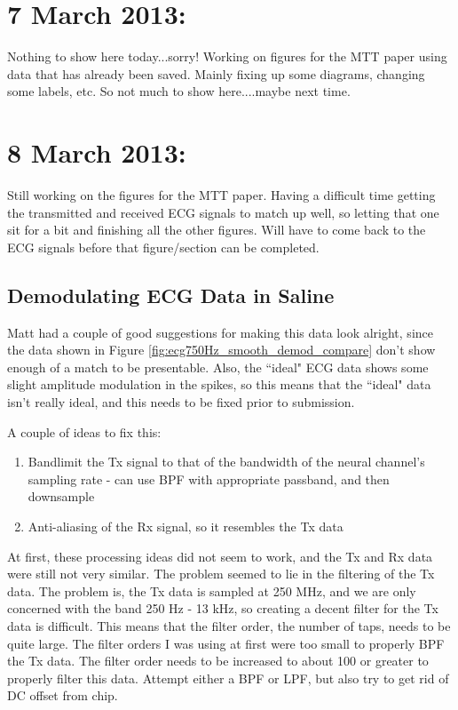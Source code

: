 \documentclass[12pt,onecolumn,titlepage]{article}
\begin{document}
\clearpage
\section{7 March 2013:}

\indent \indent Nothing to show here today...sorry! Working on figures for the MTT paper using data that has already been saved. Mainly fixing up some diagrams, changing some labels, etc. So not much to show here....maybe next time.


\clearpage
\section{8 March 2013:}

\indent \indent Still working on the figures for the MTT paper. Having a difficult time getting the transmitted and received ECG signals to match up well, so letting that one sit for a bit and finishing all the other figures. Will have to come back to the ECG signals before that figure/section can be completed.

\subsection{Demodulating ECG Data in Saline}
\indent \indent Matt had a couple of good suggestions for making this data look alright, since the data shown in Figure \ref{fig:ecg750Hz_smooth_demod_compare} don't show enough of a match to be presentable. Also, the ``ideal" ECG data shows some slight amplitude modulation in the spikes, so this means that the ``ideal" data isn't really ideal, and this needs to be fixed prior to submission.

A couple of ideas to fix this:
\begin{enumerate}
\item Bandlimit the Tx signal to that of the bandwidth of the neural channel's sampling rate - can use BPF with appropriate passband, and then downsample
\item Anti-aliasing of the Rx signal, so it resembles the Tx data
\end{enumerate}

At first, these processing ideas did not seem to work, and the Tx and Rx data were still not very similar. The problem seemed to lie in the filtering of the Tx data. The problem is, the Tx data is sampled at 250 MHz, and we are only concerned with the band 250 Hz - 13 kHz, so creating a decent filter for the Tx data is difficult. This means that the filter order, the number of taps, needs to be quite large. The filter orders I was using at first were too small to properly BPF the Tx data. The filter order needs to be increased to about 100 or greater to properly filter this data. Attempt either a BPF or LPF, but also try to get rid of DC offset from chip.
\end{document}
